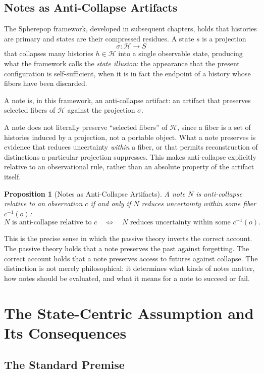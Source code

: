 \documentclass[12pt, a4paper, openany]{book}
\theoremstyle{plain}
\newtheorem{proposition}[theorem]{Proposition}
\theoremstyle{definition}
\theoremstyle{remark}
\newcommand{\calH}{\mathcal{H}}
\begin{document}
\section{Notes as Anti-Collapse Artifacts}

The Spherepop framework, developed in subsequent chapters, holds that histories
are primary and states are their compressed residues. A state $s$ is a projection
\[
\sigma : \calH \to S
\]
that collapses many histories $h \in \calH$ into a single observable state,
producing what the framework calls the \emph{state illusion}: the appearance that
the present configuration is self-sufficient, when it is in fact the endpoint of
a history whose fibers have been discarded.

A note is, in this framework, an anti-collapse artifact: an artifact that preserves
selected fibers of $\calH$ against the projection $\sigma$.

A note does not literally preserve ``selected fibers'' of $\calH$, since a fiber
is a set of histories induced by a projection, not a portable object. What a
note preserves is evidence that reduces uncertainty \emph{within} a fiber, or
that permits reconstruction of distinctions a particular projection suppresses.
This makes anti-collapse explicitly relative to an observational rule, rather
than an absolute property of the artifact itself.

\begin{proposition}[Notes as Anti-Collapse Artifacts]
A note $N$ is anti-collapse relative to an observation $c$ if and only if $N$
reduces uncertainty within some fiber $c^{-1}(o)$:
\[
N \text{ is anti-collapse relative to } c
\quad\Longleftrightarrow\quad
N \text{ reduces uncertainty within some } c^{-1}(o).
\]
\end{proposition}

This is the precise sense in which the passive theory inverts the correct account.
The passive theory holds that a note preserves the past against forgetting. The
correct account holds that a note preserves access to futures against collapse.
The distinction is not merely philosophical: it determines what kinds of notes
matter, how notes should be evaluated, and what it means for a note to succeed
or fail.

\chapter{The State-Centric Assumption and Its Consequences}

\section{The Standard Premise}
\end{document}

